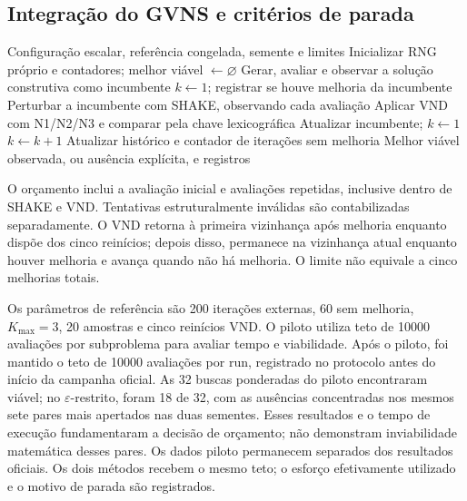 \documentclass[12pt,a4paper]{article}
\begin{document}
\subsection{Integração do GVNS e critérios de parada}

\begin{algorithm}[H]
\caption{GVNS escalar com observação e orçamento comum}
\label{alg:gvns_multiobjetivo}
\begin{algorithmic}[1]
\Require Configuração escalar, referência congelada, semente e limites
\State Inicializar RNG próprio e contadores; melhor viável $\gets\varnothing$
\State Gerar, avaliar e observar a solução construtiva como incumbente
  \State $k\gets1$; registrar se houve melhoria da incumbente
    \State Perturbar a incumbente com SHAKE, observando cada avaliação
    \State Aplicar VND com N1/N2/N3 e comparar pela chave lexicográfica
      \State Atualizar incumbente; $k\gets1$
    \Else
      \State $k\gets k+1$
    \EndIf
  \EndWhile
  \State Atualizar histórico e contador de iterações sem melhoria
\EndWhile
\State \Return Melhor viável observada, ou ausência explícita, e registros
\end{algorithmic}
\end{algorithm}

O orçamento inclui a avaliação inicial e avaliações repetidas, inclusive
dentro de SHAKE e VND. Tentativas estruturalmente inválidas são contabilizadas
separadamente. O VND retorna à primeira vizinhança após melhoria enquanto
dispõe dos cinco reinícios; depois disso, permanece na vizinhança atual
enquanto houver melhoria e avança quando não há melhoria. O limite não
equivale a cinco melhorias totais.

Os parâmetros de referência são 200 iterações externas, 60 sem melhoria,
$K_{\max}=3$, 20 amostras e cinco reinícios VND. O piloto utiliza teto de
\num{10000} avaliações por subproblema para avaliar tempo e viabilidade.
Após o piloto, foi mantido o teto de \num{10000} avaliações por run,
registrado no protocolo antes do início da campanha oficial. As 32 buscas
ponderadas do piloto encontraram viável; no $\varepsilon$-restrito, foram
18 de 32, com as ausências concentradas nos mesmos sete pares mais apertados
nas duas sementes. Esses resultados e o tempo de execução fundamentaram
a decisão de orçamento; não demonstram inviabilidade matemática desses pares.
Os dados piloto permanecem separados dos resultados oficiais.
Os dois métodos recebem o mesmo teto;
o esforço efetivamente utilizado e o motivo de parada são registrados.
\end{document}
